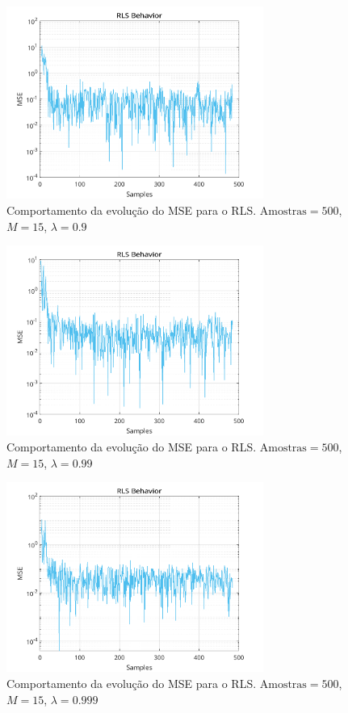 \documentclass[a4paper,10pt]{article}
\begin{document}
\begin{enumerate}
				\begin{figure}[H]
					\centering
					\includegraphics[width=0.75\textwidth]{figs/L4Q5_rls_9.png}
					\caption{Comportamento da evolução do MSE para o RLS. $\text{Amostras} = 500$, $M = 15$, $\lambda = 0.9$}
					\label{fig:L4Q5_a2}
				\end{figure}

				\begin{figure}[H]
					\centering
					\includegraphics[width=0.75\textwidth]{figs/L4Q5_rls_99.png}
					\caption{Comportamento da evolução do MSE para o RLS. $\text{Amostras} = 500$, $M = 15$, $\lambda = 0.99$}
					\label{fig:L4Q5_a3}
				\end{figure}

				\begin{figure}[H]
					\centering
					\includegraphics[width=0.75\textwidth]{figs/L4Q5_rls_999.png}
					\caption{Comportamento da evolução do MSE para o RLS. $\text{Amostras} = 500$, $M = 15$, $\lambda = 0.999$}
					\label{fig:L4Q5_a4}
				\end{figure}

		\end{enumerate}
\end{document}

